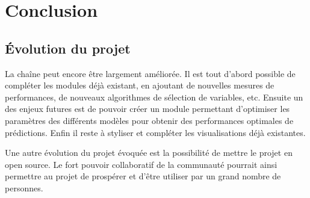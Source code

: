 \chapter{Conclusion}

\section{Évolution du projet}

La chaîne peut encore être largement améliorée. Il est tout d’abord possible de compléter les modules déjà existant, en ajoutant de nouvelles mesures de performances, de nouveaux algorithmes de sélection de variables, etc. Ensuite un des enjeux futures est de pouvoir créer un module permettant d’optimiser les paramètres des différents modèles pour obtenir des performances optimales de prédictions. Enfin il reste à styliser et compléter les visualisations déjà existantes.

Une autre évolution du projet évoquée est la possibilité de mettre le projet en open source. Le fort pouvoir collaboratif de la communauté pourrait ainsi permettre au projet de prospérer et d’être utiliser par un grand nombre de personnes.
